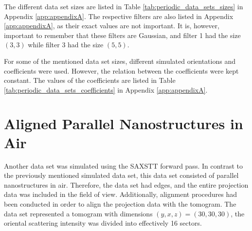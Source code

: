 The different data set sizes are listed in Table \ref{tab:periodic_data_sets_sizes} in Appendix \ref{app:appendixA}.
The respective filters are also listed in Appendix \ref{app:appendixA}, as their exact values are not important.
It is, however, important to remember that these filters are Gaussian, and filter 1 had the size $(3,3)$ while filter 3 had the size $(5,5)$. %

For some of the mentioned data set sizes, different simulated orientations and coefficients were used.
However, the relation between the coefficients were kept constant.
The values of the coefficients are listed in Table \ref{tab:periodic_data_sets_coefficients} in Appendix \ref{app:appendixA}.


\section{Aligned Parallel Nanostructures in Air}
\label{sec:aligned_parallel_nanostructures_in_air}
Another data set was simulated using the SAXSTT forward pass. In contrast to the previously mentioned simulated data set,
this data set consisted of parallel nanostructures in air. Therefore, the data set had edges, and the entire projection data was included in the field of view.
Additionally, alignment procedures had been conducted in order to align the projection data with the tomogram.
The data set represented a tomogram with dimensions $(y,x,z) = (30,30,30)$, the oriental scattering intensity was divided into effectively 16 sectors.


